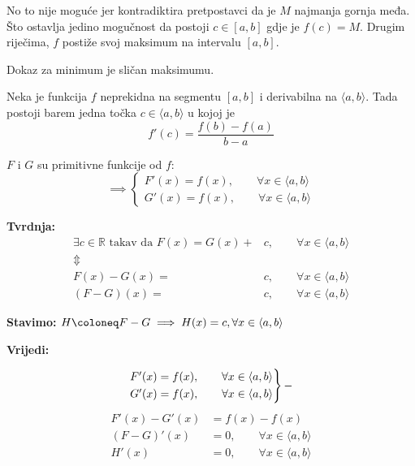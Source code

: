 No to nije moguće jer kontradiktira pretpostavci da je $M$ najmanja gornja međa.
Što ostavlja jedino mogučnost da postoji $c\in[a,b]$ gdje je $f(c)=M$.
Drugim riječima, $f$ postiže svoj maksimum na intervalu $[a,b]$.

Dokaz za minimum je sličan maksimumu.

\newpage
\begin{theorem}
    \label{thorem:lagrange}

    Neka je funkcija $f$ neprekidna na segmentu $[a,b]$ i derivabilna na $\langle a,b \rangle$.
    Tada postoji barem jedna točka $c\in\langle a,b \rangle$ u kojoj je
    $$
        f'(c) = \frac{f(b)-f(a)}{b-a}
    $$
\end{theorem}

\begin{multicols}{2}

\noindent
$F$ i $G$ su primitivne funkcije od $f$:
$$
\implies \begin{cases}
    F'(x) = f(x),\qquad \forall x\in\langle a,b \rangle\\
    G'(x) = f(x),\qquad \forall x\in\langle a,b \rangle
\end{cases}
$$

\noindent
\textbf{Tvrdnja:}
\begin{align*}
\exists c\in\mathbb{R}\text{ takav da }F(x) = G(x) +& c,\qquad\forall x\in \langle a,b \rangle\\
\Updownarrow\qquad&\\
F(x) - G(x) =& c,\qquad\forall x\in \langle a,b \rangle\\
(F-G)(x) =& c,\qquad\forall x\in \langle a,b \rangle
\end{align*}

\noindent
\textbf{Stavimo:} $H\coloneq F - G \implies H(x)=c,\space\forall x\in \langle a,b \rangle$

\noindent
\textbf{Vrijedi:}

$$
\begin{rcases}
    F'(x) = f(x),\qquad\forall x\in \langle a,b \rangle\\
    G'(x) = f(x),\qquad\forall x\in \langle a,b \rangle
\end{rcases} -
$$
\begin{align*}
    F'(x)-G'(x)&=f(x)-f(x)\\
    (F-G)'(x)&=0,\qquad\forall x\in \langle a,b \rangle\\
    \label{eq:h_is_zero}
    H'(x)&=0,\qquad\forall x\in \langle a,b \rangle\tag{A}
\end{align*}


\end{multicols}
